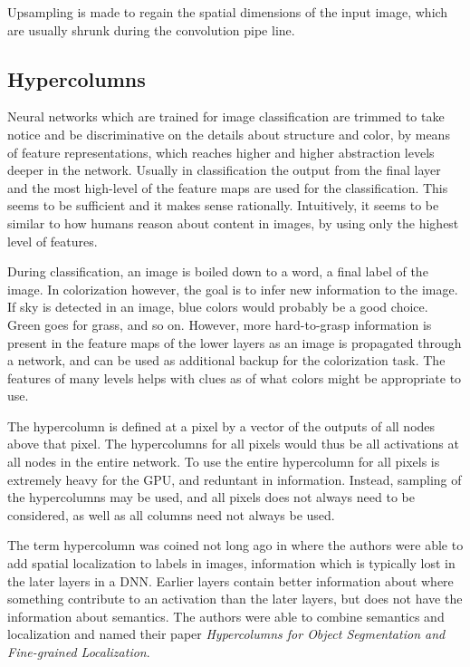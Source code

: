 Upsampling is made to regain the spatial dimensions of the input image, which are usually shrunk during the convolution pipe line. 

\subsection{Hypercolumns}
Neural networks which are trained for image classification are trimmed to take notice and be discriminative on the details about structure and color, by means of feature representations, which reaches higher and higher abstraction levels deeper in the network. Usually in classification the output from the final layer and the most high-level of the feature maps are used for the classification. This seems to be sufficient and it makes sense rationally. Intuitively, it seems to be similar to how humans reason about content in images, by using only the highest level of features. 

During classification, an image is boiled down to a word, a final label of the image. In colorization however, the goal is to infer new information to the image. If sky is detected in an image, blue colors would probably be a good choice. Green goes for grass, and so on. However, more hard-to-grasp information is present in the feature maps of the lower layers as an image is propagated through a network, and can be used as additional backup for the colorization task. The features of many levels helps with clues as of what colors might be appropriate to use. 

The hypercolumn is defined at a pixel by a vector of the outputs of all nodes above that pixel. The hypercolumns for all pixels would thus be all activations at all nodes in the entire network. To use the entire hypercolumn for all pixels is extremely heavy for the GPU, and reduntant in information. Instead, sampling of the hypercolumns may be used, and all pixels does not always need to be considered, as well as all columns need not always be used. 

The term hypercolumn was coined not long ago in \citep{Hypercolumns} where the authors were able to add spatial localization to labels in images, information which is typically lost in the later layers in a DNN. Earlier layers contain better information about where something contribute to an activation than the later layers, but does not have the information about semantics. The authors were able to combine semantics and localization and named their paper \emph{Hypercolumns for Object Segmentation and Fine-grained Localization}.























